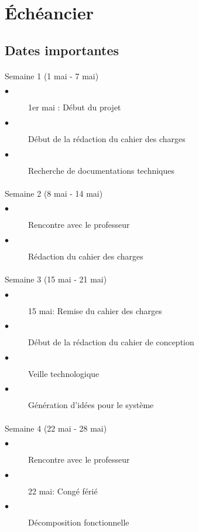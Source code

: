 \section{Échéancier}

	\subsection{Dates importantes}
	
		\begin{multicols}{2}

		\paragraph{}
		Semaine 1 (1 mai - 7 mai)
			\begin{description}
				\item[$\bullet$] 1er mai : Début du projet
				\item[$\bullet$] Début de la rédaction du cahier des charges
				\item[$\bullet$] Recherche de documentations techniques
			\end{description}
	
		\paragraph{}
		Semaine 2 (8 mai - 14 mai)
			\begin{description}
				\item[$\bullet$] Rencontre avec le professeur
				\item[$\bullet$] Rédaction du cahier des charges
			\end{description}
		
		\paragraph{}
		Semaine 3 (15 mai - 21 mai)
			\begin{description}
				\item[$\bullet$] 15 mai: Remise du cahier des charges
				\item[$\bullet$] Début de la rédaction du cahier de conception
				\item[$\bullet$] Veille technologique
				\item[$\bullet$] Génération d'idées pour le système					
			\end{description}
		
		\paragraph{}
		Semaine 4 (22 mai - 28 mai)
			\begin{description}
				\item[$\bullet$] Rencontre avec le professeur
				\item[$\bullet$] 22 mai: Congé férié				
				\item[$\bullet$] Décomposition fonctionnelle
				

\end{description}
\end{multicols}
